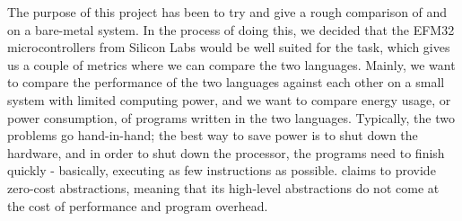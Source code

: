 The purpose of this project has been to try and give a rough comparison of {\rust} and {\C} on a bare-metal system.
In the process of doing this, we decided that the EFM32 microcontrollers from Silicon Labs would be well suited for the task, which gives us a couple of metrics where we can compare the two languages.
Mainly, we want to compare the performance of the two languages against each other on a small system with limited computing power, and we want to compare energy usage, or power consumption, of programs written in the two languages.
Typically, the two problems go hand-in-hand; the best way to save power is to shut down the hardware, and in order to shut down the processor, the programs need to finish quickly - basically, executing as few instructions as possible.
\rust claims to provide zero-cost abstractions, meaning that its high-level abstractions do not come at the cost of performance and program overhead.

